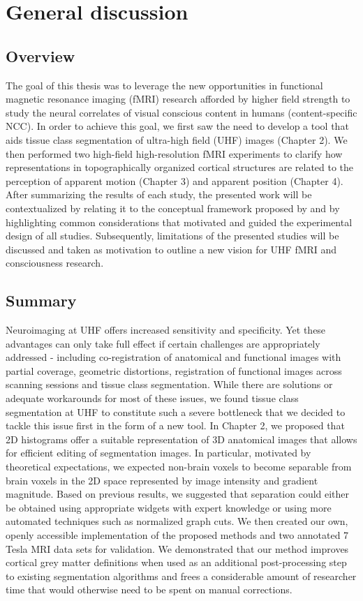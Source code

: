 \chapter{General discussion}

\clearpage{\thispagestyle{empty}\cleardoublepage}

\section{Overview}
The goal of this thesis was to leverage the new opportunities in functional magnetic resonance imaging (fMRI) research afforded by higher field strength to study the neural correlates of visual conscious content in humans (content-specific NCC). In order to achieve this goal, we first saw the need to develop a tool that aids tissue class segmentation of ultra-high field (UHF) images (Chapter 2). We then performed two high-field high-resolution fMRI experiments to clarify how representations in topographically organized cortical structures are related to the perception of apparent motion (Chapter 3) and apparent position (Chapter 4). After summarizing the results of each study, the presented work will be contextualized by relating it to the conceptual framework proposed by \cite{DeGraaf2012} and by highlighting common considerations that motivated and guided the experimental design of all studies. Subsequently, limitations of the presented studies will be discussed and taken as motivation to outline a new vision for UHF fMRI and consciousness research.

\section{Summary}
Neuroimaging at UHF offers increased sensitivity and specificity. Yet these advantages can only take full effect if certain challenges are appropriately addressed - including co-registration of anatomical and functional images with partial coverage, geometric distortions, registration of functional images across scanning sessions and tissue class segmentation. While there are solutions or adequate workarounds for most of these issues, we found tissue class segmentation at UHF to constitute such a severe bottleneck that we decided to tackle this issue first in the form of a new tool. In Chapter 2, we proposed that 2D histograms offer a suitable representation of 3D anatomical images that allows for efficient editing of segmentation images. In particular, motivated by theoretical expectations, we expected non-brain voxels to become separable from brain voxels in the 2D space represented by image intensity and gradient magnitude. Based on previous results, we suggested that separation could either be obtained using appropriate widgets with expert knowledge or using more automated techniques such as normalized graph cuts. We then created our own, openly accessible implementation of the proposed methods and two annotated 7 Tesla MRI data sets for validation. We demonstrated that our method improves cortical grey matter definitions when used as an additional post-processing step to existing segmentation algorithms and frees a considerable amount of researcher time that would otherwise need to be spent on manual corrections. 

